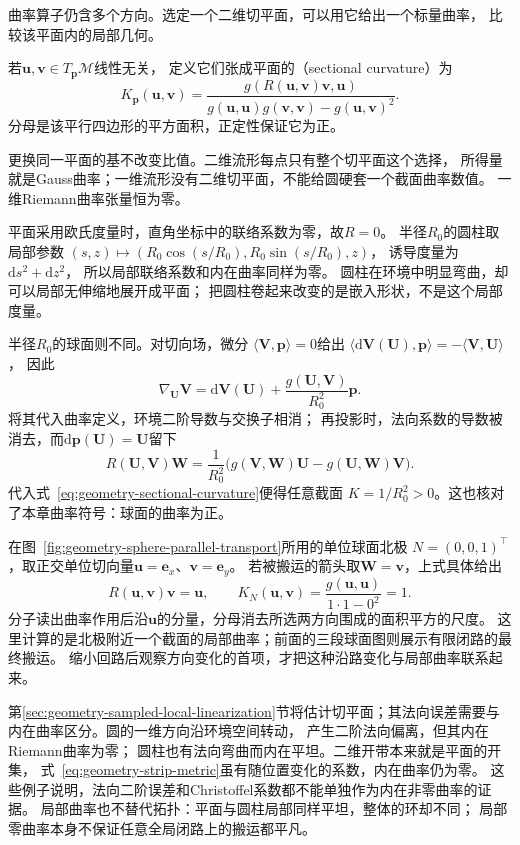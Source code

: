 曲率算子仍含多个方向。选定一个二维切平面，可以用它给出一个标量曲率，
比较该平面内的局部几何。
\begin{definition}[截面曲率]
\label{def:geometry-sectional-curvature}
若$\bm u,\bm v\in T_{\bm p}\mathcal M$线性无关，
定义它们张成平面的（sectional curvature）为
\begin{equation}
 K_{\bm p}(\bm u,\bm v)
 =\frac{g(R(\bm u,\bm v)\bm v,\bm u)}
 {g(\bm u,\bm u)g(\bm v,\bm v)-g(\bm u,\bm v)^2}.
 \label{eq:geometry-sectional-curvature}
\end{equation}
分母是该平行四边形的平方面积，正定性保证它为正。
\end{definition}
更换同一平面的基不改变比值。二维流形每点只有整个切平面这个选择，
所得量就是Gauss曲率；一维流形没有二维切平面，不能给圆硬套一个截面曲率数值。
一维Riemann曲率张量恒为零。

平面采用欧氏度量时，直角坐标中的联络系数为零，故$R=0$。
半径$R_0$的圆柱取局部参数
$(s,z)\mapsto(R_0\cos(s/R_0),R_0\sin(s/R_0),z)$，
诱导度量为$\mathrm ds^2+\mathrm dz^2$，
所以局部联络系数和内在曲率同样为零。
圆柱在环境中明显弯曲，却可以局部无伸缩地展开成平面；
把圆柱卷起来改变的是嵌入形状，不是这个局部度量。

半径$R_0$的球面则不同。对切向场，微分
$\langle\bm V,\bm p\rangle=0$给出
$\langle\mathrm d\bm V(\bm U),\bm p\rangle=-\langle\bm V,\bm U\rangle$，
因此
\[
 \nabla_{\bm U}\bm V
 =\mathrm d\bm V(\bm U)+\frac{g(\bm U,\bm V)}{R_0^2}\bm p.
\]
将其代入曲率定义，环境二阶导数与交换子相消；
再投影时，法向系数的导数被消去，而$\mathrm d\bm p(\bm U)=\bm U$留下
\[
 R(\bm U,\bm V)\bm W
 =\frac1{R_0^2}\bigl(g(\bm V,\bm W)\bm U-g(\bm U,\bm W)\bm V\bigr).
\]
代入式~\eqref{eq:geometry-sectional-curvature}便得任意截面
$K=1/R_0^2>0$。这也核对了本章曲率符号：球面的曲率为正。

在图~\ref{fig:geometry-sphere-parallel-transport}所用的单位球面北极
$N=(0,0,1)^\top$，取正交单位切向量$\bm u=\bm e_x$、$\bm v=\bm e_y$。
若被搬运的箭头取$\bm W=\bm v$，上式具体给出
\[
 R(\bm u,\bm v)\bm v=\bm u,\qquad
 K_N(\bm u,\bm v)=
 \frac{g(\bm u,\bm u)}{1\cdot1-0^2}=1.
\]
分子读出曲率作用后沿$\bm u$的分量，分母消去所选两方向围成的面积平方的尺度。
这里计算的是北极附近一个截面的局部曲率；前面的三段球面图则展示有限闭路的最终搬运。
缩小回路后观察方向变化的首项，才把这种沿路变化与局部曲率联系起来。

第\ref{sec:geometry-sampled-local-linearization}节将估计切平面；其法向误差需要与内在曲率区分。圆的一维方向沿环境空间转动，
产生二阶法向偏离，但其内在Riemann曲率为零；
圆柱也有法向弯曲而内在平坦。二维开带本来就是平面的开集，
式~\eqref{eq:geometry-strip-metric}虽有随位置变化的系数，内在曲率仍为零。
这些例子说明，法向二阶误差和Christoffel系数都不能单独作为内在非零曲率的证据。
局部曲率也不替代拓扑：平面与圆柱局部同样平坦，整体的环却不同；
局部零曲率本身不保证任意全局闭路上的搬运都平凡。

